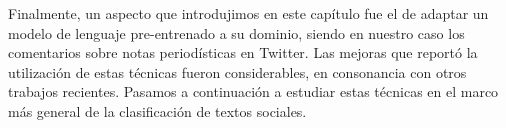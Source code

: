 Finalmente, un aspecto que introdujimos en este capítulo fue el de adaptar un modelo de lenguaje pre-entrenado a su dominio, siendo en nuestro caso los comentarios sobre notas periodísticas en Twitter. Las mejoras que reportó la utilización de estas técnicas fueron considerables, en consonancia con otros trabajos recientes. Pasamos a continuación a estudiar estas técnicas en el marco más general de la clasificación de textos sociales.